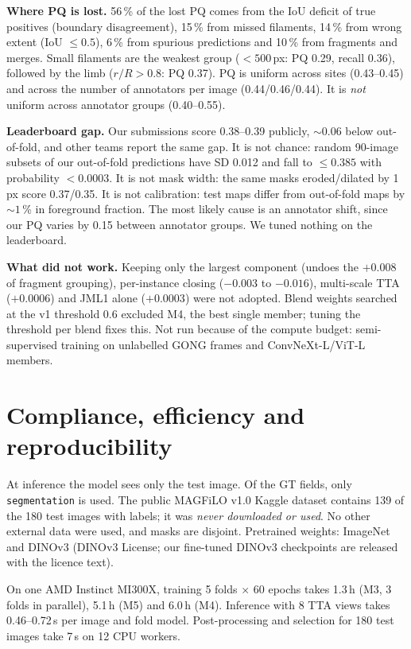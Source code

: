 \textbf{Where PQ is lost.} 56\,\% of the lost PQ comes from the IoU deficit of true positives (boundary
disagreement), 15\,\% from missed filaments, 14\,\% from wrong extent (IoU $\le0.5$), 6\,\% from spurious
predictions and 10\,\% from fragments and merges. Small filaments are the weakest group ($<500$\,px: PQ 0.29,
recall 0.36), followed by the limb ($r/R>0.8$: PQ 0.37). PQ is uniform across sites (0.43--0.45) and across the
number of annotators per image (0.44/0.46/0.44). It is \emph{not} uniform across annotator groups (0.40--0.55).

\textbf{Leaderboard gap.} Our submissions score 0.38--0.39 publicly, ${\sim}0.06$ below out-of-fold, and other teams
report the same gap. It is not chance: random 90-image subsets of our out-of-fold predictions have SD 0.012 and fall
to $\le0.385$ with probability $<0.0003$. It is not mask width: the same masks eroded/dilated by 1\,px score
0.37/0.35. It is not calibration: test maps differ from out-of-fold maps by ${\sim}1$\,\% in foreground fraction.
The most likely cause is an annotator shift, since our PQ varies by 0.15 between annotator groups. We tuned nothing
on the leaderboard.

\textbf{What did not work.} Keeping only the largest component (undoes the $+0.008$ of fragment grouping),
per-instance closing ($-0.003$ to
$-0.016$), multi-scale TTA ($+0.0006$) and JML1 alone ($+0.0003$) were not adopted. Blend weights searched at the v1
threshold 0.6 excluded M4, the best single member; tuning the threshold per blend fixes this. Not run because of
the compute budget: semi-supervised training on unlabelled GONG frames and ConvNeXt-L/ViT-L members.

\section{Compliance, efficiency and reproducibility}
At inference the model sees only the test image. Of the GT fields, only \texttt{segmentation} is used. The public
MAGFiLO v1.0 Kaggle dataset contains 139 of the 180 test images with labels; it was \emph{never downloaded or used}.
No other external data were used, and masks are disjoint. Pretrained weights: ImageNet and DINOv3 (DINOv3 License;
our fine-tuned DINOv3 checkpoints are released with the licence text).

On one AMD Instinct MI300X, training 5 folds $\times$ 60 epochs takes 1.3\,h (M3, 3 folds in parallel), 5.1\,h (M5)
and 6.0\,h (M4). Inference with 8 TTA views takes 0.46--0.72\,s per image and fold model. Post-processing and
selection for 180 test images take 7\,s on 12 CPU workers.

